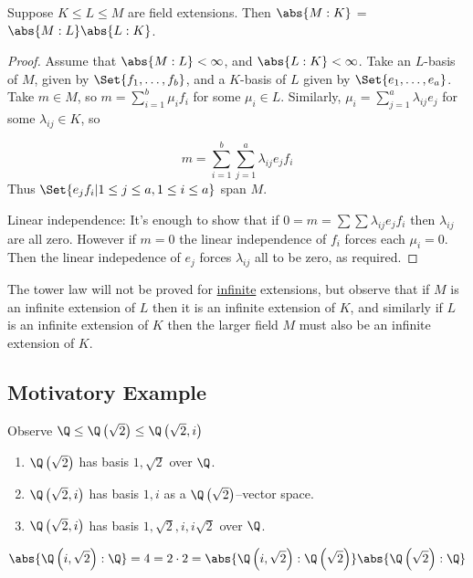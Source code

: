 \documentclass{article}
\begin{document}
\begin{nthm}\label{thm:towerLaw}
    Suppose $K \leq L \leq M$ are field extensions. Then $\abs{M:K}$ = $\abs{M:L}\abs{L:K}$.
\end{nthm}
\begin{proof}
    Assume that $\abs{M:L} < \infty$, and $\abs{L:K} < \infty$.
    Take an $L$-basis of $M$, given by $\Set{f_1, \dotsc, f_b}$, and a $K$-basis of $L$ given by $\Set{e_1, \dotsc, e_a}$.
    Take $m \in M$, so $m = \sum_{i=1}^b \mu_i f_i$ for some $\mu_i \in L$.
    Similarly, $\mu_i = \sum_{j=1}^a \lambda_{ij} e_j$ for some $\lambda_{ij} \in K$, so

    \begin{equation*}
        m = \sum_{i=1}^b \sum_{j=1}^a \lambda_{ij} e_j f_i
    \end{equation*}
    Thus $\Set{e_j f_i | 1 \leq j \leq a, 1 \leq i \leq a}$ span $M$.

    Linear independence:
    It's enough to show that if $0 = m = \sum \sum \lambda_{ij} e_j f_i$ then $\lambda_{ij}$ are all zero.
    However if $m = 0$ the linear independence of $f_i$ forces each $\mu_i = 0$.
    Then the linear indepedence of $e_j$ forces $\lambda_{ij}$ all to be zero, as required.
\end{proof}

The tower law will not be proved for \hyperlink{def:degreeOfFieldExt}{infinite} extensions, but observe that if $M$ is an infinite extension of $L$ then it is an infinite extension of $K$, and similarly if $L$ is an infinite extension of $K$ then the larger field $M$ must also be an infinite extension of $K$.

\subsection{Motivatory Example}
Observe $\Q \leq \Q\left(\sqrt{2}\right) \leq \Q\left(\sqrt{2}, i\right)$
\begin{enumerate}[label=(\roman*)]
    \item $\Q\left(\sqrt{2}\right)$ has basis $1, \sqrt{2}$ over $\Q$.
    \item $\Q\left(\sqrt{2}, i\right)$ has basis $1, i$ as a $\Q\left(\sqrt{2}\right)$--vector space.
    \item $\Q\left(\sqrt{2}, i\right)$ has basis $1, \sqrt{2}, i, i\sqrt{2}$ over $\Q$.
\end{enumerate}
\begin{equation*}
    \abs{\Q\left(i, \sqrt{2}\right):\Q} = 4 = 2 \cdot 2 = \abs{\Q\left(i, \sqrt{2}\right) : \Q\left(\sqrt{2}\right)} \abs{\Q\left(\sqrt{2}\right):\Q}
\end{equation*}
\end{document}
